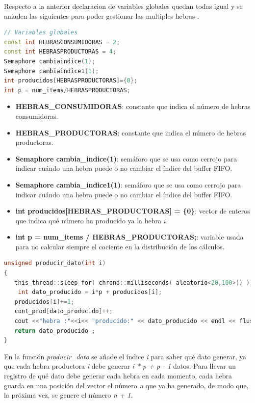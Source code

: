 \documentclass{article}
\begin{document}
Respecto a la anterior declaracion de variables globales quedan todas igual y se aniaden las siguientes para poder gestionar las multiples hebras .
\begin{lstlisting}[language=C++,caption=Variables globales para el problema multi productor consumidor ] // Variables globales
const int HEBRASCONSUMIDORAS = 2;
const int HEBRASPRODUCTORAS = 4;
Semaphore cambiaindice(1);
Semaphore cambiaindice1(1);
int producidos[HEBRASPRODUCTORAS]={0};
int p = num_items/HEBRASPRODUCTORAS;
\end{lstlisting}
\begin{itemize}
    \item \textbf{HEBRAS\_CONSUMIDORAS}: constante que indica el número de hebras consumidoras.
    \item \textbf{HEBRAS\_PRODUCTORAS}: constante que indica el número de hebras productoras.
    \item \textbf{Semaphore cambia\_indice(1)}: semáforo que se usa como cerrojo para indicar cuándo una hebra puede o no cambiar el índice del buffer FIFO.
    \item \textbf{Semaphore cambia\_indice1(1)}: semáforo que se usa como cerrojo para indicar cuándo una hebra puede o no cambiar el índice del buffer FIFO.
    \item \textbf{int producidos[HEBRAS\_PRODUCTORAS] = \{0\}}: vector de enteros que indica qué número ha producido ya la hebra \(i\).
    \item \textbf{int p = num\_items / HEBRAS\_PRODUCTORAS;}: variable usada para no calcular siempre el cociente en la distribución de los cálculos.
\end{itemize}

\begin{lstlisting}[language=C++,caption=función producir dato para varias hebras ] 
unsigned producir_dato(int i)
{
   this_thread::sleep_for( chrono::milliseconds( aleatorio<20,100>() ));
	int dato_producido = i*p + producidos[i];
   producidos[i]+=1;
   cont_prod[dato_producido]++;
   cout <<"hebra :"<<i<< "producido:" << dato_producido << endl << flush ;
   return dato_producido ;
}
\end{lstlisting}
En la función \textit{producir\_dato} se añade el índice \textit{i} para saber qué dato generar, ya que cada hebra productora \textit{i} debe generar \textit{i * p + p - 1} datos. Para llevar un registro de qué dato debe generar cada hebra en cada momento, cada hebra guarda en una posición del vector el número \textit{n} que ya ha generado, de modo que, la próxima vez, se genere el número \textit{n + 1}.
\end{document}
